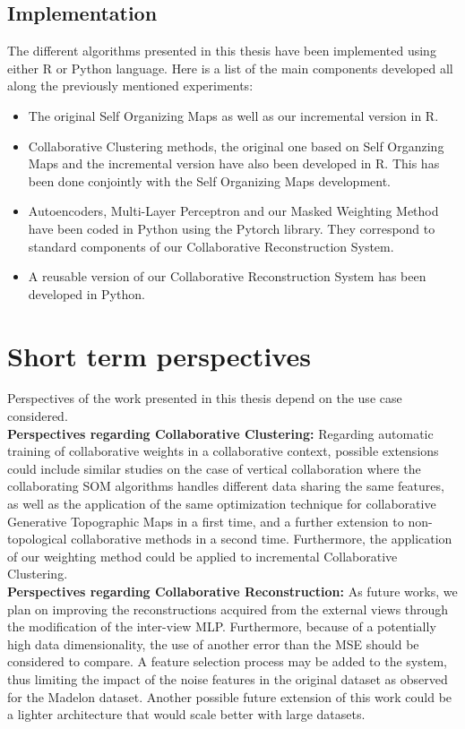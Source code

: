 \subsection{Implementation}
The different algorithms presented in this thesis have been implemented using either R or Python language. Here is a list of the main components developed all along the previously mentioned experiments:
\begin{itemize}
    \item The original Self Organizing Maps as well as our incremental version in R.
    \item Collaborative Clustering methods, the original one based on Self Organzing Maps and the incremental version have also been developed in R. This has been done conjointly with the Self Organizing Maps development.
    \item Autoencoders, Multi-Layer Perceptron and our Masked Weighting Method have been coded in Python using the Pytorch library. They correspond to standard components of our Collaborative Reconstruction System.
    \item A reusable version of our Collaborative Reconstruction System has been developed in Python.
\end{itemize}

\section{Short term perspectives}

Perspectives of the work presented in this thesis depend on the use case considered.\\

\textbf{Perspectives regarding Collaborative Clustering:} Regarding automatic training of collaborative weights in a collaborative context, possible extensions could include similar studies on the case of vertical collaboration where the collaborating SOM algorithms handles different data sharing the same features, as well as the application of the same optimization technique for collaborative Generative Topographic Maps in a first time, and a further extension to non-topological collaborative methods in a second time. Furthermore, the application of our weighting method could be applied to incremental Collaborative Clustering.\\

\textbf{Perspectives regarding Collaborative Reconstruction:} As future works, we plan on improving the reconstructions acquired from the external views through the modification of the inter-view MLP\@. Furthermore, because of a potentially high data dimensionality, the use of another error than the MSE should be considered to compare. A feature selection process may be added to the system, thus limiting the impact of the noise features in the original dataset as observed for the Madelon dataset. Another possible future extension of this work could be a lighter architecture that would scale better with large datasets. 

